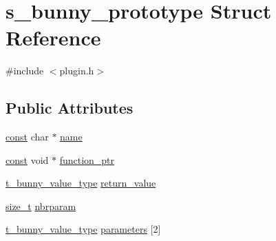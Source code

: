 \hypertarget{structs__bunny__prototype}{\section{s\-\_\-bunny\-\_\-prototype Struct Reference}
\label{structs__bunny__prototype}
}


{\ttfamily \#include $<$plugin.\-h$>$}

\subsection*{Public Attributes}
\begin{DoxyCompactItemize}
\item 
\hyperlink{term__entry_8h_a57bd63ce7f9a353488880e3de6692d5a}{const} char $\ast$ \hyperlink{structs__bunny__prototype_a3deddb00bd9870447aeadc35202bfccb}{name}
\item 
\hyperlink{term__entry_8h_a57bd63ce7f9a353488880e3de6692d5a}{const} void $\ast$ \hyperlink{structs__bunny__prototype_a6bf5828b9e47e1589d61064029a50da3}{function\-\_\-ptr}
\item 
\hyperlink{plugin_8h_a55796ce95dcd437c2c6385e31c1586f2}{t\-\_\-bunny\-\_\-value\-\_\-type} \hyperlink{structs__bunny__prototype_af185415cd4f07a5ac4bd4a3f698b1a35}{return\-\_\-value}
\item 
\hyperlink{nc__alloc_8h_a7b60c5629e55e8ec87a4547dd4abced4}{size\-\_\-t} \hyperlink{structs__bunny__prototype_a3929d9d5d7cf994f2222e6febf296f07}{nbrparam}
\item 
\hyperlink{plugin_8h_a55796ce95dcd437c2c6385e31c1586f2}{t\-\_\-bunny\-\_\-value\-\_\-type} \hyperlink{structs__bunny__prototype_a9b8043caea0ae08be8f91645c9e11ba3}{parameters} \mbox{[}2\mbox{]}
\end{DoxyCompactItemize}



